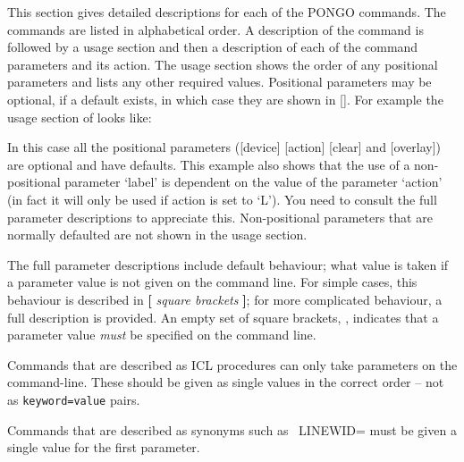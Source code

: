 This section gives detailed descriptions for each of the PONGO
commands.  The commands are listed in alphabetical order.  A
description of the command is followed by a usage section and then a
description of each of the command parameters and its action.  The
usage section shows the order of any positional parameters and lists
any other required values. Positional parameters may be optional, if
a default exists, in which case they are shown in [].  For example the usage
section of  looks like:
\begin{quote}
\begin{description}
\end{description}
\end{quote}
In this case all the positional parameters ([device] [action] [clear]
and [overlay]) are optional and have defaults. This example also
shows that the use of a non-positional parameter `label' is dependent on
the value of the parameter `action' (in fact it will only be used if
action is set to `L'). You need to consult the full parameter
descriptions to appreciate this. Non-positional parameters that are
normally defaulted are not shown in the usage section.

The full parameter descriptions include default behaviour; \ie what
value is taken if a parameter value is not given on the command line.
For simple cases, this behaviour is described in {\bf[} {\em square
brackets} {\bf]}; for more complicated behaviour, a full description
is provided.  An empty set of square brackets, \ie {\bf []}, indicates
that a parameter value {\em must} be specified on the command line.

Commands that are described as ICL procedures can only take
parameters on the command-line. These should be given as single
values in the correct order -- not as \verb+keyword=value+ pairs.

Commands that are described as synonyms such as ~LINEWID=
must be given a single value for the first parameter.

